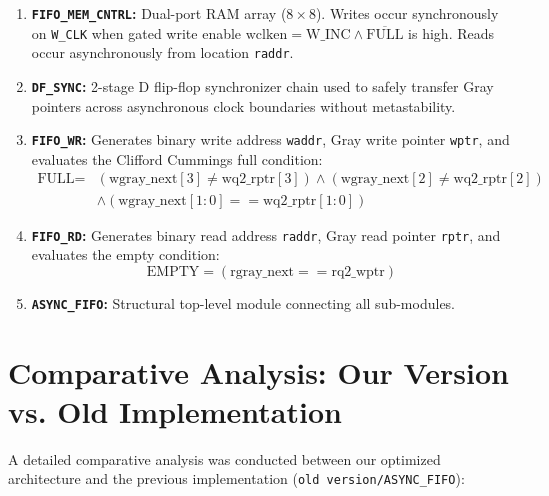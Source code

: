 \documentclass[12pt,a4paper]{article}
\begin{document}
\begin{enumerate}
    \item \textbf{\texttt{FIFO\_MEM\_CNTRL}:} Dual-port RAM array ($8 \times 8$). Writes occur synchronously on \texttt{W\_CLK} when gated write enable $\text{wclken} = \text{W\_INC} \land \overline{\text{FULL}}$ is high. Reads occur asynchronously from location \texttt{raddr}.
    \item \textbf{\texttt{DF\_SYNC}:} 2-stage D flip-flop synchronizer chain used to safely transfer Gray pointers across asynchronous clock boundaries without metastability.
    \item \textbf{\texttt{FIFO\_WR}:} Generates binary write address \texttt{waddr}, Gray write pointer \texttt{wptr}, and evaluates the Clifford Cummings full condition:
    \begin{align*}
        \text{FULL} = & (\text{wgray\_next}[3] \neq \text{wq2\_rptr}[3]) \land (\text{wgray\_next}[2] \neq \text{wq2\_rptr}[2]) \\
                      & \land (\text{wgray\_next}[1:0] == \text{wq2\_rptr}[1:0])
    \end{align*}
    \item \textbf{\texttt{FIFO\_RD}:} Generates binary read address \texttt{raddr}, Gray read pointer \texttt{rptr}, and evaluates the empty condition:
    \[
        \text{EMPTY} = (\text{rgray\_next} == \text{rq2\_wptr})
    \]
    \item \textbf{\texttt{ASYNC\_FIFO}:} Structural top-level module connecting all sub-modules.
\end{enumerate}

\section{Comparative Analysis: Our Version vs. Old Implementation}

A detailed comparative analysis was conducted between our optimized architecture and the previous implementation (\texttt{old version/ASYNC\_FIFO}):
\end{document}
